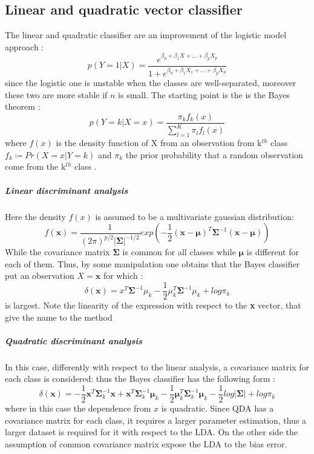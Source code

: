 \documentclass[
12pt, %
a4paper, %
oneside, %
headinclude,footinclude, %
BCOR5mm, %
]{scrartcl}
\begin{document}
\subsection{Linear and quadratic vector classifier}
The linear and quadratic classifier are an improvement of the logistic model approach \cite{james2013introduction}: 
\begin{equation}
p(Y=1|X)=\dfrac{e^{\beta_{0}+\beta_{1}X+...+\beta_{p}X_{p}}}{1+e^{\beta_{0}+\beta_{1}X_{1}+...+\beta_{p}X_{p}}}
\end{equation}
since the logistic one is unstable when the classes are well-separated, moreover these two are more stable if $n$ is small. The starting point is the is the Bayes theorem \cite{james2013introduction}:
\begin{equation}
p(Y=k|X=x)=\dfrac{\pi_{k}f_{k}(x)}{\sum_{l=1}^{K}\pi_{l}f_{l}(x)}
\end{equation}
where $f(x)$ is the density function of X from an observation from k$^{th}$ class  $f_{k}\coloneqq Pr(X=x|Y=k)$ and $\pi_{k}$ the prior probability that a random observation come from the k$^{th}$ class \cite{james2013introduction}. 

\subparagraph{Linear discriminant analysis}
Here the density $f(x)$ is assumed to be a multivariate gaussian distribution\cite{james2013introduction}: 
\begin{equation}
f(\textbf{x})=\dfrac{1}{\left(2 \pi\right)^{p/2}\lvert \boldsymbol {\Sigma}\rvert^{-1/2} }exp \left(-\frac{1}{2}\left(\textbf{x}-\boldsymbol{\mu}\right)^{T}\boldsymbol {\Sigma}^{-1}\left(\textbf{x}-\boldsymbol{\mu}\right)\right)
\end{equation}
While the covariance matrix $\boldsymbol {\Sigma}$ is common for all classes while $\boldsymbol{\mu}$ is different for each of them. Thus, by some manipulation one obtains that the Bayes classifier put an observation $X=\textbf{x}$ for which \cite{james2013introduction}:
\begin{equation}
\delta(\textbf{x})=x^{T} \boldsymbol {\Sigma}^{-1} \mu_{k}-\frac{1}{2}\mu^{T}_{k}\boldsymbol {\Sigma}^{-1}\mu_{k}+log\pi_{k}
\end{equation}
is largest. Note the linearity of the expression with respect to the \textbf{x} vector, that give the name to the method 
\subparagraph{Quadratic discriminant analysis}
In this case, differently with respect to the linear analysis, a covariance matrix for each class is considered: thus the Bayes classifier has the following form \cite{james2013introduction}:  
\begin{equation}
\delta(\textbf{x})=-\dfrac{1}{2}\textbf{x}^{T}\boldsymbol {\Sigma}^{-1}_{k}\textbf{x}+\textbf{x}^{T}\boldsymbol {\Sigma}^{-1}_{k}\boldsymbol{\mu}_{k}-\dfrac{1}{2}\boldsymbol{\mu}_{k}^{T}\boldsymbol {\Sigma}^{-1}_{k}\boldsymbol{\mu}_{k}-\dfrac{1}{2}log\lvert \boldsymbol {\Sigma}\rvert+log\pi_{k}
\end{equation}
where in this case the dependence from $x$ is quadratic. Since QDA has a covariance matrix for each class, it requires a larger parameter estimation, thus a larger dataset is required for it with respect to the LDA. On the other side the assumption of common covariance matrix expose the LDA to the bias error.
\end{document}
